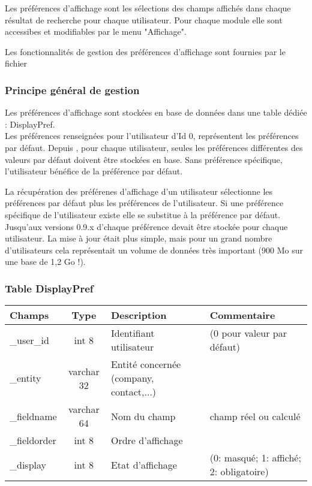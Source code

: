 Les préférences d'affichage sont les sélections des champs affichés dans chaque résultat de recherche pour chaque utilisateur. Pour chaque module elle sont accessibes et modifiables par le menu "Affichage".

Les fonctionnalités de gestion des préférences d'affichage sont fournies par le fichier 

\subsubsection{Principe général de gestion}

Les préférences d'affichage sont stockées en base de données dans une table dédiée : DisplayPref.\\

Les préférences renseignées pour l'utilisateur d'Id 0, représentent les préférences par défaut.
Depuis , pour chaque utilisateur, seules les préférences différentes des valeurs par défaut doivent être stockées en base. Sans préférence spécifique, l'utilisateur bénéfice de la préférence par défaut.

La récupération des préférenes d'affichage d'un utilisateur sélectionne les préférences par défaut plus les préférences de l'utilisateur. Si une préférence spécifique de l'utilisateur existe elle se substitue à la préférence par défaut.\\

Jusqu'aux versions 0.9.x d'\obm chaque préférence devait être stockée pour chaque utilisateur. La mise à jour était plus simple, mais pour un grand nombre d'utilisateurs cela représentait un volume de données très important (900 Mo sur une base de 1,2 Go !).


\subsubsection{Table DisplayPref}


\begin{tabular}{|p{3cm}|c|p{5.4cm}|p{2.6cm}|}
\hline
\textbf{Champs} & \textbf{Type} & \textbf{Description} & \textbf{Commentaire} \\
\hline
\_user\_id & int 8 & Identifiant utilisateur & (0 pour valeur par défaut) \\
\hline
\_entity & varchar 32 & Entité concernée (company, contact,...) & \\
\hline
\_fieldname & varchar 64 & Nom du champ & champ réel ou calculé \\
\hline
\_fieldorder & int 8 & Ordre d'affichage & \\
\hline
\_display & int 8 & Etat d'affichage & (0: masqué; 1: affiché; 2: obligatoire)\\
\hline
\end{tabular}


